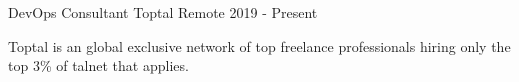 

\begin{cventries}

  \cventry
  {DevOps Consultant} %
  {Toptal} %
  {Remote} %
  {2019 - Present} %
  {
    \begin{cvitems} %
      {Toptal is an global exclusive network of top freelance professionals hiring only the top 3\% of talnet that applies.}
    \end{cvitems}
  }

\end{cventries}
